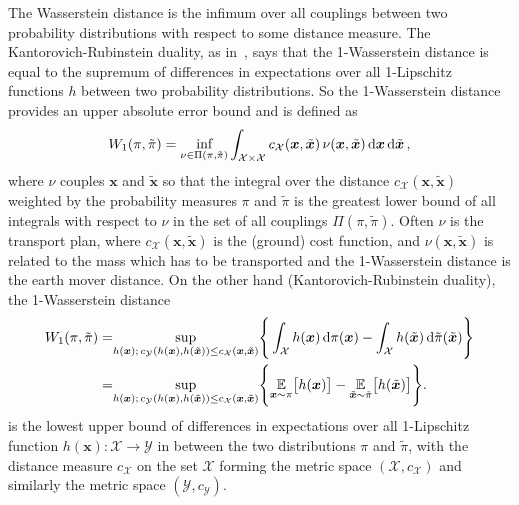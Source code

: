 The Wasserstein distance is the infimum over all couplings between two probability distributions with respect to some distance measure.
The Kantorovich-Rubinstein duality, as in~\cite{thickstun2019kantorovich, Ambrosio2024Kanta}, says that the 1-Wasserstein distance is equal to the supremum of differences in expectations over all 1-Lipschitz functions $h$ between two probability distributions.
So the 1-Wasserstein distance provides an upper absolute error bound and is defined as
\begin{align}
	W_1(\pi,\tilde{\pi}) = \underset{  \nu \in \Pi(\pi,\tilde{\pi}) }{ \text{inf}}\int_{\mathcal{X} \times \mathcal{X}} c_{\mathcal{X}}(\bm{x},\tilde{\bm{x}}) \, \nu(\bm{x},\tilde{\bm{x}}) \mathop{}\!\mathrm{d} \bm{x} \mathop{}\!\mathrm{d} \tilde{\bm{x}}
	\label{eq:wass} \, ,
\end{align}
where $\nu$ couples $\bm{x}$ and $\tilde{\bm{x}}$ so that the integral over the distance $c_{\mathcal{X}}(\bm{x},\tilde{\bm{x}}) $ weighted by the probability measures $\pi$ and $\tilde{\pi}$ is the greatest lower bound of all integrals with respect to $\nu$ in the set of all couplings $ \Pi(\pi,\tilde{\pi})$.
Often $\nu$ is the transport plan, where $c_{\mathcal{X}}(\bm{x},\tilde{\bm{x}})$ is the (ground) cost function, and $\nu(\bm{x}, \tilde{\bm{x}})$ is related to the mass which has to be transported and the 1-Wasserstein distance is the earth mover distance.
On the other hand (Kantorovich-Rubinstein duality), the 1-Wasserstein distance
\begin{align}
	W_1(\pi,\tilde{\pi})  =& \underset{ h(\bm{x}); \, c_{\mathcal{Y}}(h(\bm{x}), h(\tilde{\bm{x}}) ) \leq  c_{\mathcal{X}}(\bm{x},\tilde{\bm{x}}) }{ \text{sup}} \Bigg\{  \int_{\mathcal{X}} h(\bm{x}) \mathop{}\!\mathrm{d} \pi (\bm{x})  - \int_{\mathcal{X}} h(\tilde{\bm{x}}) \mathop{}\!\mathrm{d} \tilde{\pi} (\tilde{\bm{x}}) \Bigg\} \\
	=& \underset{ h(\bm{x});  \, c_{\mathcal{Y}}(h(\bm{x}), h(\tilde{\bm{x}}) )  \leq  c_{\mathcal{X}}(\bm{x},\tilde{\bm{x}}) }{ \text{sup}}  \Bigg\{  \underset{\bm{x} \sim  \pi }{\mathbb{E}} \big[ h(\bm{x}) \big]  -  \underset{\tilde{\bm{x}}\sim \tilde{\pi}}{\mathbb{E}} \big[ h(\tilde{\bm{x}}) \big] \Bigg\} .
\end{align}
is the lowest upper bound of differences in expectations over all 1-Lipschitz function $h(\bm{x}) : \mathcal{X} \rightarrow \mathcal{Y}$ in between the two distributions $\pi$ and $\tilde{\pi}$, with the distance measure $c_{\mathcal{X}}$ on the set $\mathcal{X}$ forming the metric space $( \mathcal{X}, c_{\mathcal{X}} )$ and similarly the metric space $(\mathcal{Y}, c_{\mathcal{Y}})$.


